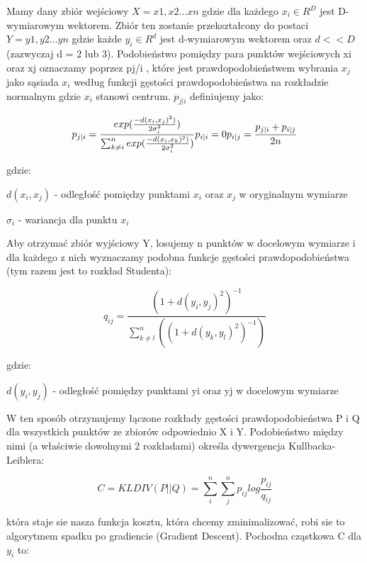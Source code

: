 \documentclass{article}
\begin{document}
Mamy dany zbiór wejściowy $X = {x1, x2...xn}$ gdzie dla każdego $x_i \in R^{D}$
jest D-wymiarowym wektorem. Zbiór ten zostanie przekształcony do
postaci $Y = {y1, y2...yn}$ gdzie każde $y_i \in R^d$ jest d-wymiarowym
wektorem oraz $d << D$ (zazwyczaj d = 2 lub 3). Podobieństwo pomiędzy
para punktów wejściowych xi oraz xj oznaczamy poprzez pj/i , które jest
prawdopodobieństwem wybrania $x_j$ jako sąsiada $x_i$ według funkcji gęstości
prawdopodobieństwa na rozkładzie normalnym gdzie $x_i$ stanowi centrum.
$p_{j|i}$ definiujemy jako:

\begin{equation}
    p_{j|i} = \frac{exp(\frac{-d(x_i, x_j)^2)}{2\sigma_{i}^2})}{\sum_{k \neq i}^{n} exp(\frac{-d(x_i, x_k)^2)}{2\sigma_{i}^2})} \\
    p_{i|i} = 0 \\
    p_{i|j} = \frac{p_{j|i} + p_{i|j}}{2n} 
\end{equation}

gdzie:

$d(x_i, x_j)$ - odległość pomiędzy punktami $x_i$ oraz $x_j$ w oryginalnym wymiarze

$\sigma_i$ - wariancja dla punktu $x_i$

Aby otrzymać zbiór wyjściowy Y, losujemy n punktów w docelowym
wymiarze i dla każdego z nich wyznaczamy podobna funkcje gęstości
prawdopodobieństwa (tym razem jest to rozkład Studenta):

\begin{equation}
   q_{ij} = \frac{(1 + d(y_i, y_j)^2)^{-1}}{\sum_{k \neq l}^{n}((1 + d(y_k, y_l)^2)^{-1})}
\end{equation}

gdzie:

$d(y_i, y_j)$ - odległość pomiędzy punktami yi oraz yj w docelowym wymiarze

W ten sposób otrzymujemy łączone rozkłady gęstości prawdopodobieństwa
P i Q dla wszystkich punktów ze zbiorów odpowiednio X i Y. Podobieństwo
między nimi (a właściwie dowolnymi 2 rozkładami) określa dywergencja
Kullbacka-Leiblera:

\begin{equation}
    C = KLDIV(P || Q) = \sum_i^n\sum_j^n p_{ij}log \frac{p_{ij}}{q_{ij}}
\end{equation}

która staje sie nasza funkcja kosztu, która chcemy zminimalizować, robi sie
to algorytmem spadku po gradiencie (Gradient Descent). Pochodna
cząstkowa C dla $y_i$ to:
\end{document}
